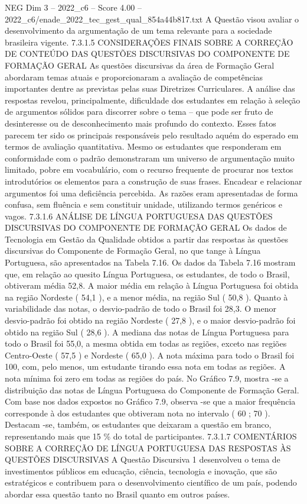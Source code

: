 \begin{textsample}{NEG Dim 3 – 2022\_c6 – Score 4.00 – 2022\_c6/enade\_2022\_tec\_gest\_qual\_854a44b817.txt}
A Questão visou avaliar o desenvolvimento da argumentação de um tema relevante para a sociedade brasileira vigente. 7.3.1.5 CONSIDERAÇÕES FINAIS SOBRE A CORREÇÃO DE CONTEÚDO DAS QUESTÕES DISCURSIVAS DO COMPONENTE DE FORMAÇÃO GERAL As questões discursivas da área de Formação Geral abordaram temas atuais e proporcionaram a avaliação de competências importantes dentre as previstas pelas suas Diretrizes Curriculares.
A análise das respostas revelou, principalmente, dificuldade dos estudantes em relação à seleção de argumentos sólidos para discorrer sobre o tema – que pode ser fruto de desinteresse ou de desconhecimento mais profundo do contexto.
Esses fatos parecem ter sido os principais responsáveis pelo resultado aquém do esperado em termos de avaliação quantitativa.
Mesmo os estudantes que responderam em conformidade com o padrão demonstraram um universo de argumentação muito limitado, pobre em vocabulário, com o recurso frequente de procurar nos textos introdutórios os elementos para a construção de suas frases.
Encadear e relacionar argumentos foi uma deficiência percebida.
As razões eram apresentadas de forma confusa, sem fluência e sem constituir unidade, utilizando termos genéricos e vagos. 7.3.1.6 ANÁLISE DE LÍNGUA PORTUGUESA DAS QUESTÕES DISCURSIVAS DO COMPONENTE DE FORMAÇÃO GERAL Os dados de Tecnologia em Gestão da Qualidade obtidos a partir das respostas às questões discursivas do Componente de Formação Geral, no que tange à Língua Portuguesa, são apresentados na Tabela 7.16.
Os dados da Tabela 7.16 mostram que, em relação ao quesito Língua Portuguesa, os estudantes, de todo o Brasil, obtiveram média 52,8.
A maior média em relação à Língua Portuguesa foi obtida na região Nordeste ( 54,1 ), e a menor média, na região Sul ( 50,8 ).
Quanto à variabilidade das notas, o desvio-padrão de todo o Brasil foi 28,3.
O menor desvio-padrão foi obtido na região Nordeste ( 27,8 ), e o maior desvio-padrão foi obtido na região Sul ( 28,6 ).
A mediana das notas de Língua Portuguesa para todo o Brasil foi 55,0, a mesma obtida em todas as regiões, exceto nas regiões Centro-Oeste ( 57,5 ) e Nordeste ( 65,0 ).
A nota máxima para todo o Brasil foi 100, com, pelo menos, um estudante tirando essa nota em todas as regiões.
A nota mínima foi zero em todas as regiões do país.
No Gráfico 7.9, mostra -se a distribuição das notas de Língua Portuguesa do Componente de Formação Geral.
Com base nos dados expostos no Gráfico 7.9, observa -se que a maior frequência corresponde à dos estudantes que obtiveram nota no intervalo ( 60 ; 70 ).
Destacam -se, também, os estudantes que deixaram a questão em branco, representando mais que 15 \% do total de participantes. 7.3.1.7 COMENTÁRIOS SOBRE A CORREÇÃO DE LÍNGUA PORTUGUESA DAS RESPOSTAS ÀS QUESTÕES DISCURSIVAS A Questão Discursiva 1 desenvolveu o tema de investimentos públicos em educação, ciência, tecnologia e inovação, que são estratégicos e contribuem para o desenvolvimento científico de um país, podendo abordar essa questão tanto no Brasil quanto em outros países.

\end{textsample}
